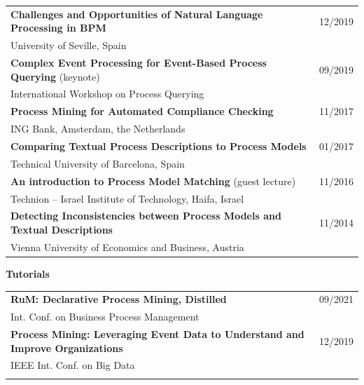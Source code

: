 \begin{tabular}{p{13.5cm}l}

	
\textbf{Challenges and Opportunities of Natural Language Processing in BPM} & 12/2019 \\	
{University of Seville, Spain}  \\
	\noalign{\smallskip\smallskip}

\textbf{Complex Event Processing for Event-Based Process Querying} (keynote) & 09/2019 \\
{International Workshop on Process Querying} \\
	\noalign{\smallskip\smallskip}

\textbf{Process Mining for Automated Compliance Checking} & 11/2017\\	
	{ING Bank, Amsterdam, the Netherlands}  \\

	\noalign{\smallskip\smallskip}
	
\textbf{Comparing Textual Process Descriptions to Process Models} & 01/2017\\
	{Technical University of Barcelona, Spain} \\

	\noalign{\smallskip\smallskip}

	\textbf{An introduction to Process Model Matching} (guest lecture) & 11/2016 \\	
	{Technion -- Israel Institute of Technology, Haifa, Israel}  \\

	\noalign{\smallskip\smallskip}
\textbf{Detecting Inconsistencies between Process Models and Textual Descriptions} & 11/2014 \\
	{Vienna University of Economics and Business, Austria} \\

	
\end{tabular}

\medskip
\textbf{Tutorials} 
\smallskip 
 
\begin{tabular}{p{13.5cm}l}
	
	
	\textbf{RuM: Declarative Process Mining, Distilled} & 09/2021  \\
	Int. Conf. on Business Process Management \\
	\noalign{\smallskip\smallskip}
	
		\textbf{Process Mining: Leveraging Event Data to Understand and Improve Organizations} & 12/2019 \\
	IEEE Int. Conf. on Big Data \\
	\noalign{\smallskip\smallskip}

\end{tabular}


